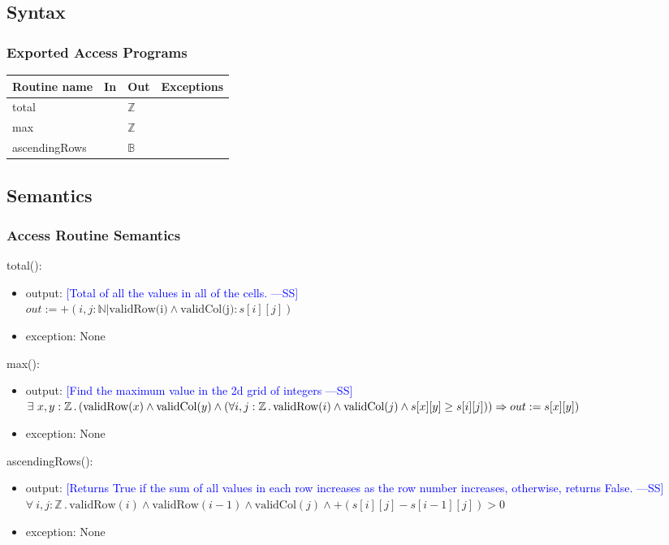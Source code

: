 \documentclass[12pt]{article}
\newcommand{\authornote}[3]{\textcolor{#1}{[#3 ---#2]}}
\newcommand{\authornote}[3]{}
\newcommand{\wss}[1]{\authornote{blue}{SS}{#1}}
\begin{document}
\subsection* {Syntax}

\subsubsection* {Exported Access Programs}

\begin{tabular}{| l | l | l | p{6cm} |}
\hline
\textbf{Routine name} & \textbf{In} & \textbf{Out} & \textbf{Exceptions}\\
\hline
total & & $\mathbb{Z}$ & \\
\hline
max &  & $\mathbb{Z}$ & \\
\hline
ascendingRows & & $\mathbb{B}$ & \\
\hline
\end{tabular}

\subsection* {Semantics}

\subsubsection* {Access Routine Semantics}

\noindent total():
\begin{itemize}
\item output: \wss{Total of all the values in all of the cells.}\\
$out := +(i,j : \mathbb{N} | \mbox{validRow(i)} \land \mbox{validCol(j)} : s[i][j])$
\item exception: None
\end{itemize}

\noindent max():
\begin{itemize}
\item output: \wss{Find the maximum value in the 2d grid of integers}\\
$\exists \ x,y : \mathbb{Z} \,.\, (\mbox{validRow}(x) \land \mbox{validCol}(y) \land \\ (\forall i,j : \mathbb{Z} \,.\, \mbox{validRow}(i) \land \mbox{validCol}(j) \land s[x][y] \geq s[i][j])) \Rightarrow out := s[x][y])$
\item exception: None
\end{itemize}

\noindent ascendingRows():
\begin{itemize}
\item output: \wss{Returns True if the sum of all values in each row increases
    as the row number increases, otherwise, returns False.}\\
$\forall \ i, j : \mathbb{Z} \,.\, \mbox{validRow}(i) \land \mbox{validRow}(i-1) \land \mbox{validCol}(j) \land +(s[i][j] - s[i-1][j]) > 0$
\item exception: None
\end{itemize}
\end{document}

